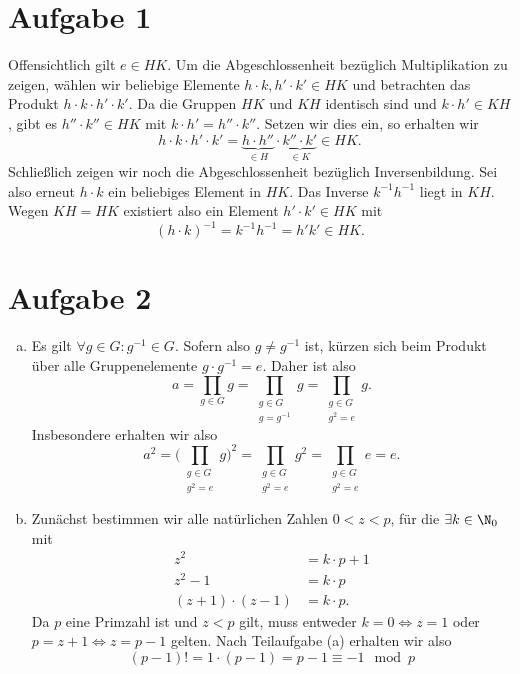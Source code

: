 \documentclass{article}
\begin{document}
    \section*{Aufgabe 1}
    Offensichtlich gilt $e \in HK$. Um die Abgeschlossenheit bezüglich Multiplikation zu zeigen, wählen wir beliebige Elemente $h\cdot k, h'\cdot k' \in HK$ und betrachten das Produkt $h\cdot k \cdot h' \cdot k'$. Da die Gruppen $HK$ und $KH$ identisch sind und $k\cdot h' \in KH$, gibt es $h'' \cdot k''\in HK$ mit $k\cdot h' = h''\cdot k''$. Setzen wir dies ein, so erhalten wir 
    \[h\cdot k \cdot h' \cdot k' = \underbrace{h\cdot h''}_{\in H}\cdot \underbrace{k'' \cdot k'}_{\in K} \in HK.\]
    Schließlich zeigen wir noch die Abgeschlossenheit bezüglich Inversenbildung. Sei also erneut $h \cdot k$ ein beliebiges Element in $HK$. Das Inverse $k^{-1}h^{-1}$ liegt in $KH$. Wegen $KH = HK$ existiert also ein Element $h'\cdot k' \in HK$ mit \[(h\cdot k)^{-1} = k^{-1}h^{-1} = h'k' \in HK.\]
    \section*{Aufgabe 2}
    \begin{enumerate}[(a)]
        \item Es gilt $\forall g \in G: g^{-1} \in G$. Sofern also $g \neq g^{-1}$ ist, kürzen sich beim Produkt über alle Gruppenelemente $g \cdot g^{-1} = e$. Daher ist also
        \[
            a = \prod_{g\in G} g = \prod_{\substack{g\in G\\g= g^{-1}}} g = \prod_{\substack{g\in G\\g^2 = e}} g.
        \]
        Insbesondere erhalten wir also
        \[
            a^2 = \bigg(\prod_{\substack{g\in G\\g^2 = e}} g\bigg)^2 = \prod_{\substack{g\in G\\g^2 = e}} g^2 = \prod_{\substack{g\in G\\g^2 = e}} e = e.
        \]
        \item Zunächst bestimmen wir alle natürlichen Zahlen $0 < z < p$, für die $\exists k \in \N_0$ mit 
        \begin{align*}
            z^2 &= k \cdot p + 1\\
            z^2 -1 &= k \cdot p\\
            (z+1) \cdot (z-1) &= k \cdot p.
        \end{align*}
        Da $p$ eine Primzahl ist und $z < p$ gilt, muss entweder $k = 0 \Leftrightarrow z = 1$ oder $p = z+1 \Leftrightarrow z = p-1$ gelten. Nach Teilaufgabe (a) erhalten wir also
        \[
            (p-1)! = 1 \cdot (p-1) = p-1 \equiv -1 \mod p  
        \]
    \end{enumerate}
\end{document}
